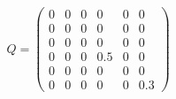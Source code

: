 \[
Q = \begin{pmatrix}
    0 & 0 & 0 & 0 &   0 & 0\\
    0 & 0 & 0 & 0 &   0 & 0\\
    0 & 0 & 0 & 0 &   0 & 0\\
    0 & 0 & 0 & 0.5 & 0 & 0\\
    0 & 0 & 0 & 0 &   0 & 0\\
    0 & 0 & 0 & 0 &   0 & 0.3
    \end{pmatrix}
\]
